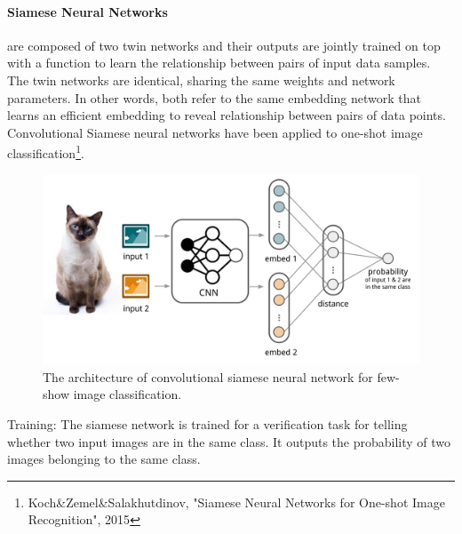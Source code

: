 \documentclass[main]{subfiles}
\begin{document}
\paragraph{Siamese Neural Networks} are composed of two twin networks and their outputs are jointly trained on top with a function to learn the relationship between pairs of input data samples. The twin networks are identical, sharing the same weights and network parameters. In other words, both refer to the same embedding network that learns an efficient embedding to reveal relationship between pairs of data points.
Convolutional Siamese neural networks have been applied to one-shot image classification\footnote{Koch\&Zemel\&Salakhutdinov, "Siamese Neural Networks for One-shot Image Recognition", 2015}. 
%
\begin{figure}[H]
    \centering
    \includegraphics[width=0.99\linewidth]{14_ContinualMetaAndTransferLearning/figures/siamese_convnet.png}
    \caption{The architecture of convolutional siamese neural network for few-show image classification.}
    \label{fig:my_label}
\end{figure}
%
Training: The siamese network is trained for a verification task for telling whether two input images are in the same class. It outputs the probability of two images belonging to the same class.
\end{document}
